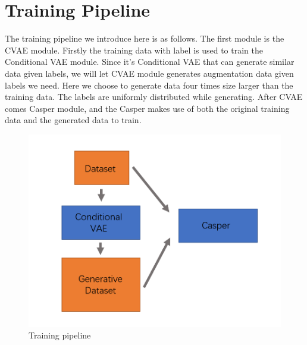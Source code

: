 \section{Training Pipeline}
The training pipeline we introduce here is as follows. The first module is the CVAE module. Firstly the training data with label is used to train the Conditional VAE module. Since it's Conditional VAE that can generate similar data given labels, we will let CVAE module generates augmentation data given labels we need. Here we choose to generate data four times size larger than the training data. The labels are uniformly distributed while generating. After CVAE comes Casper module, and the Casper makes use of both the original training data and the generated data to train. \\ 
\begin{figure}[H]
\centering
\includegraphics[width=\textwidth]{images/reimg5.png}  
\caption{Training pipeline}
\label{figure5}  
\end{figure}
